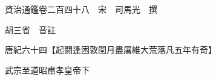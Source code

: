 










 


 
 


 

  
  
  
  
  





  
  
  
  
  
 
  

  

  
  
  



  

 
 

  
   




  

  
  


  　　資治通鑑卷二百四十八　宋　司馬光　撰

　　胡三省　音註

　　唐紀六十四【起閼逢困敦閏月盡屠維大荒落凡五年有奇】

　　武宗至道昭肅孝皇帝下

